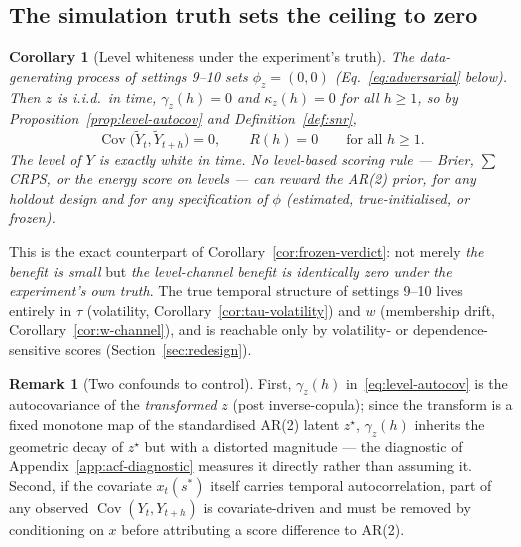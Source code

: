 \documentclass[11pt]{article}
\newtheorem{corollary}{Corollary}
\theoremstyle{definition}
\newtheorem{remark}{Remark}
\newcommand{\Cov}{\operatorname{Cov}}
\begin{document}
\subsection{The simulation truth sets the ceiling to zero}

\begin{corollary}[Level whiteness under the experiment's truth]
\label{cor:sim-truth-zero}
The data-generating process of settings 9--10 sets
$\phi_z = (0,0)$ (Eq.~\eqref{eq:adversarial} below). Then $z$ is
i.i.d.\ in time, $\gamma_z(h) = 0$ and $\kappa_z(h) = 0$ for all
$h\ge1$, so by Proposition~\ref{prop:level-autocov} and
Definition~\ref{def:snr},
\begin{equation}
  \Cov\big(\widetilde Y_t,\widetilde Y_{t+h}\big) = 0,
  \qquad R(h) = 0
  \qquad\text{for all } h\ge1.
\end{equation}
The level of $Y$ is \emph{exactly white in time}. No level-based
scoring rule --- Brier, $\sum$CRPS, or the energy score on levels ---
can reward the AR(2) prior, for any holdout design and for any
specification of $\phi$ (estimated, true-initialised, or frozen).
\end{corollary}

This is the exact counterpart of Corollary~\ref{cor:frozen-verdict}:
not merely \emph{the benefit is small} but \emph{the level-channel
benefit is identically zero under the experiment's own truth}. The
true temporal structure of settings 9--10 lives entirely in $\tau$
(volatility, Corollary~\ref{cor:tau-volatility}) and $w$ (membership
drift, Corollary~\ref{cor:w-channel}), and is reachable only by
volatility- or dependence-sensitive scores
(Section~\ref{sec:redesign}).

\begin{remark}[Two confounds to control]
\label{rem:confounds}
First, $\gamma_z(h)$ in~\eqref{eq:level-autocov} is the autocovariance
of the \emph{transformed} $z$ (post inverse-copula); since the
transform is a fixed monotone map of the standardised AR(2) latent
$z^\star$, $\gamma_z(h)$ inherits the geometric decay of $z^\star$ but
with a distorted magnitude --- the diagnostic of
Appendix~\ref{app:acf-diagnostic} measures it directly rather than
assuming it. Second, if the covariate $x_t(s^*)$ itself carries
temporal autocorrelation, part of any observed
$\Cov(Y_t,Y_{t+h})$ is covariate-driven and must be removed by
conditioning on $x$ before attributing a score difference to AR(2).
\end{remark}

\end{document}
